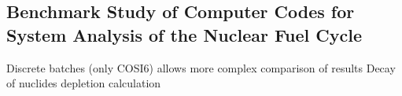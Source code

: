 \subsection{Benchmark Study of Computer Codes for System Analysis of the Nuclear Fuel Cycle}
\cite{benchmar_laurent_2009}

Discrete batches (only COSI6) allows more complex comparison of results
Decay of nuclides
depletion calculation
